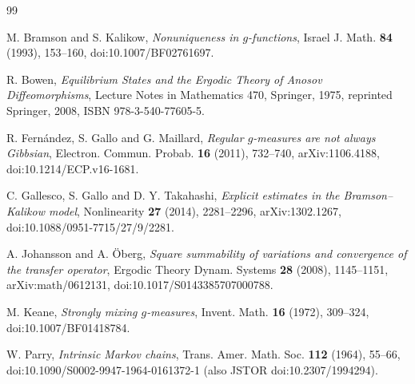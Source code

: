 \documentclass[11pt]{article}
\theoremstyle{definition}
\theoremstyle{remark}
\begin{document}
\begin{thebibliography}{99}

M. Bramson and S. Kalikow,
\emph{Nonuniqueness in $g$-functions},
Israel J. Math. \textbf{84} (1993), 153--160,
doi:10.1007/BF02761697.

R. Bowen,
\emph{Equilibrium States and the Ergodic Theory of Anosov Diffeomorphisms},
Lecture Notes in Mathematics 470, Springer, 1975,
reprinted Springer, 2008, ISBN 978-3-540-77605-5.

R. Fern\'andez, S. Gallo and G. Maillard,
\emph{Regular $g$-measures are not always Gibbsian},
Electron. Commun. Probab. \textbf{16} (2011), 732--740,
arXiv:1106.4188, doi:10.1214/ECP.v16-1681.

C. Gallesco, S. Gallo and D. Y. Takahashi,
\emph{Explicit estimates in the Bramson--Kalikow model},
Nonlinearity \textbf{27} (2014), 2281--2296,
arXiv:1302.1267, doi:10.1088/0951-7715/27/9/2281.

A. Johansson and A. \"Oberg,
\emph{Square summability of variations and convergence of the transfer
operator},
Ergodic Theory Dynam. Systems \textbf{28} (2008), 1145--1151,
arXiv:math/0612131, doi:10.1017/S0143385707000788.

M. Keane,
\emph{Strongly mixing $g$-measures},
Invent. Math. \textbf{16} (1972), 309--324,
doi:10.1007/BF01418784.

W. Parry,
\emph{Intrinsic Markov chains},
Trans. Amer. Math. Soc. \textbf{112} (1964), 55--66,
doi:10.1090/S0002-9947-1964-0161372-1
(also JSTOR doi:10.2307/1994294).

\end{thebibliography}
\end{document}
